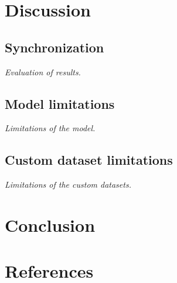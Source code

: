 \documentclass{article}
\begin{document}
\newpage
\section{Discussion}

\subsection{Synchronization}
\textit{Evaluation of results.}

\subsection{Model limitations}
\textit{Limitations of the model.}

\subsection{Custom dataset limitations}
\textit{Limitations of the custom datasets.}

\newpage
\section{Conclusion}


\newpage
\section{References}

\end{document}
